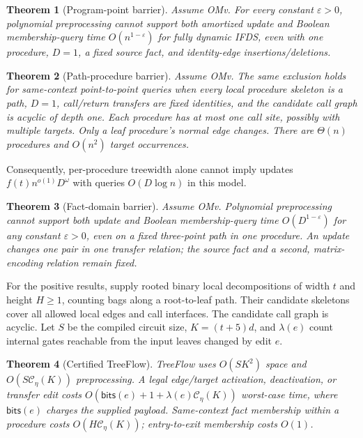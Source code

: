 \documentclass[11pt,letterpaper]{article}
\newtheorem{theorem}{Theorem}
\theoremstyle{definition}
\newcommand{\cost}{\mathcal C_\eta}
\newcommand{\bits}{\mathsf{bits}}
\begin{document}
\begin{theorem}[Program-point barrier]\label{thm:n}
Assume OMv. For every constant $\varepsilon>0$, polynomial preprocessing
cannot support both amortized update and Boolean membership-query time
$O(n^{1-\varepsilon})$ for fully dynamic IFDS, even with one procedure,
$D=1$, a fixed source fact, and identity-edge insertions/deletions.
\end{theorem}

\begin{theorem}[Path-procedure barrier]\label{thm:calls}
Assume OMv. The same exclusion holds for same-context point-to-point queries
when every local procedure skeleton is a path, $D=1$, call/return transfers
are fixed identities, and the candidate call graph is acyclic of depth one.
Each procedure has at most one call site, possibly with multiple targets.
Only a leaf procedure's normal edge changes. There are $\Theta(n)$
procedures and $O(n^2)$ target occurrences.
\end{theorem}

Consequently, per-procedure treewidth alone cannot imply updates
$f(t)n^{o(1)}D^\omega$ with queries $O(D\log n)$ in this model.

\begin{theorem}[Fact-domain barrier]\label{thm:d}
Assume OMv. Polynomial preprocessing cannot support both update and Boolean
membership-query time $O(D^{1-\varepsilon})$ for any constant
$\varepsilon>0$, even on a fixed three-point path in one procedure. An
update changes one pair in one transfer relation; the source fact and a
second, matrix-encoding relation remain fixed.
\end{theorem}

For the positive results, supply rooted binary local decompositions of
width $t$ and height $H\ge1$, counting bags along a root-to-leaf path.
Their candidate skeletons cover all allowed local edges and call interfaces.
The candidate call graph is acyclic. Let $S$ be the compiled circuit size,
$K=(t+5)d$, and $\lambda(e)$ count internal gates reachable from the
input leaves changed by edit $e$.

\begin{theorem}[Certified TreeFlow]\label{thm:upper}
TreeFlow uses $O(SK^2)$ space and $O(S\cost(K))$ preprocessing. A legal
edge/target activation, deactivation, or transfer edit costs
$O(\bits(e)+1+\lambda(e)\cost(K))$ worst-case time, where $\bits(e)$
charges the supplied payload. Same-context fact membership within a
procedure costs $O(H\cost(K))$; entry-to-exit membership costs $O(1)$.
\end{theorem}
\end{document}
